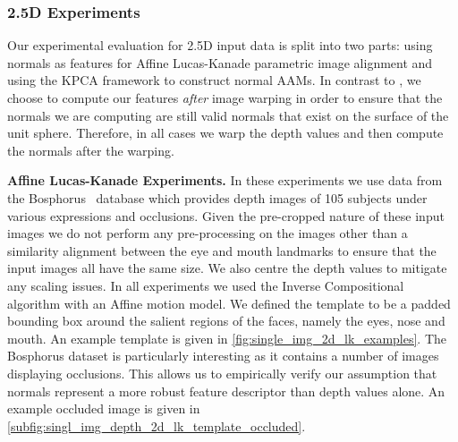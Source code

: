 \subsubsection{2.5D Experiments}\label{subsubsec:singl_img_2d_lk_experiments}
Our experimental evaluation for 2.5D input data is split into two parts: using
normals as features for Affine Lucas-Kanade parametric image alignment and
using the KPCA framework to construct normal AAMs. In contrast to
\citet{antonakos2015feature}, we choose to compute our features \textit{after}
image warping in order to ensure that the normals we are computing are still
valid normals that exist on the surface of the unit sphere. Therefore, in all
cases we warp the depth values and then compute the normals after the
warping.

\textbf{Affine Lucas-Kanade Experiments.} In these experiments we use data
from the Bosphorus~\cite{Savran:2008gg} database which provides depth images
of 105 subjects under various expressions and occlusions. Given the pre-cropped
nature of these input images we do not perform any pre-processing on the
images other than a similarity alignment between the eye and mouth landmarks to
ensure that the input images all have the same size. We also centre the depth
values to mitigate any scaling issues. In all experiments we used the 
Inverse Compositional algorithm with an Affine motion model.
We defined the template to be a padded
bounding box around the salient regions of the faces, namely the eyes, nose and
mouth. An example template is given in \cref{fig:single_img_2d_lk_examples}.
The Bosphorus dataset is particularly interesting as it contains a number of
images displaying occlusions. This allows us to empirically verify our assumption
that normals represent a more robust feature descriptor than depth values alone.
An example occluded image is given in
\cref{subfig:singl_img_depth_2d_lk_template_occluded}.

